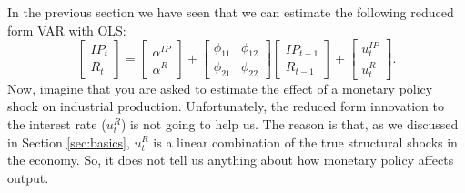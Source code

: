 \documentclass[10pt]{article}
\begin{document}
In the previous section we have seen that we can estimate the following
reduced form VAR with OLS:%
\begin{equation}
\begin{bmatrix}
IP_{t} \\ 
R_{t}%
\end{bmatrix}%
=%
\begin{bmatrix}
\alpha ^{IP} \\ 
\alpha ^{R}%
\end{bmatrix}%
+\left[ 
\begin{array}{cc}
\phi _{11} & \phi _{12} \\ 
\phi _{21} & \phi _{22}%
\end{array}%
\right] 
\begin{bmatrix}
IP_{t-1} \\ 
R_{t-1}%
\end{bmatrix}%
+%
\begin{bmatrix}
u_{t}^{IP} \\ 
u_{t}^{R}%
\end{bmatrix}%
.  \label{eq:red_2var}
\end{equation}%
Now, imagine that you are asked to estimate the effect of a monetary policy
shock on industrial production. Unfortunately, the reduced form innovation
to the interest rate ($u_{t}^{R}$) is not going to help us. The reason is
that, as we discussed in Section \ref{sec:basics}, $u_{t}^{R}$ is a linear
combination of the true structural shocks in the economy. So, it does not
tell us anything about how monetary policy affects output.
\end{document}
